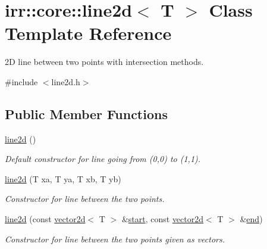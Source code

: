 \hypertarget{classirr_1_1core_1_1line2d}{}\section{irr\+:\+:core\+:\+:line2d$<$ T $>$ Class Template Reference}
\label{classirr_1_1core_1_1line2d}


2D line between two points with intersection methods.  




{\ttfamily \#include $<$line2d.\+h$>$}

\subsection*{Public Member Functions}
\begin{DoxyCompactItemize}
\item 
\mbox{\label{classirr_1_1core_1_1line2d_a7d0f25f93572eb73734da83da8490410}} 
\hyperlink{classirr_1_1core_1_1line2d_a7d0f25f93572eb73734da83da8490410}{line2d} ()
\begin{DoxyCompactList}\small\item\em Default constructor for line going from (0,0) to (1,1). \end{DoxyCompactList}\item 
\mbox{\label{classirr_1_1core_1_1line2d_af9614350cdb0527c190dcf3342ecb42e}} 
\hyperlink{classirr_1_1core_1_1line2d_af9614350cdb0527c190dcf3342ecb42e}{line2d} (T xa, T ya, T xb, T yb)
\begin{DoxyCompactList}\small\item\em Constructor for line between the two points. \end{DoxyCompactList}\item 
\mbox{\label{classirr_1_1core_1_1line2d_a447958017eba9f8667625b82c25f344c}} 
\hyperlink{classirr_1_1core_1_1line2d_a447958017eba9f8667625b82c25f344c}{line2d} (const \hyperlink{classirr_1_1core_1_1vector2d}{vector2d}$<$ T $>$ \&\hyperlink{classirr_1_1core_1_1line2d_ae9a3be281b33b15eb7de868b51651ad8}{start}, const \hyperlink{classirr_1_1core_1_1vector2d}{vector2d}$<$ T $>$ \&\hyperlink{classirr_1_1core_1_1line2d_a339c443c3be2c006ac2f616a773f2863}{end})
\begin{DoxyCompactList}\small\item\em Constructor for line between the two points given as vectors. \end{DoxyCompactList}\item 

\end{DoxyCompactItemize}
